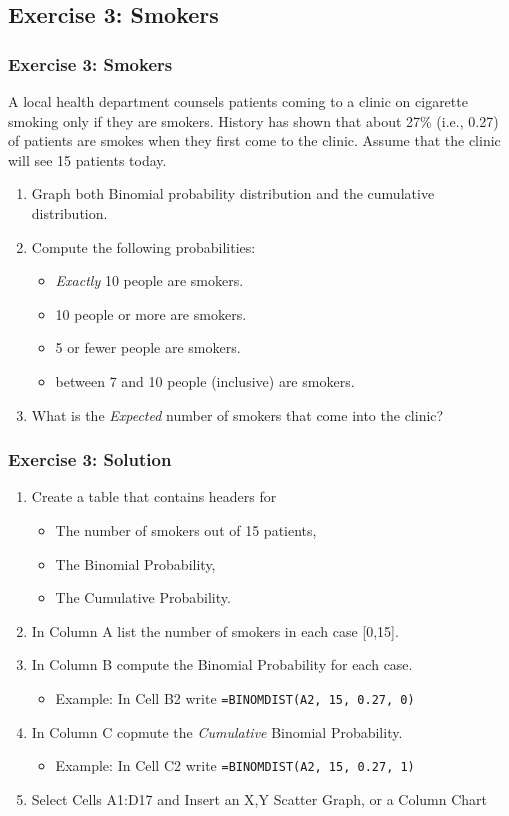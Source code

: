 \documentclass[12pt]{beamer}
\begin{document}
\subsection{Exercise 3: Smokers}
	\begin{frame}
		\frametitle{Exercise 3: Smokers}
		A local health department counsels patients coming to a clinic on cigarette smoking only if they are smokers. History has shown that about 27\% (i.e., 0.27) of patients are smokes when they first come to the clinic. Assume that the clinic will see 15 patients today.\\
		\bigskip
		\begin{enumerate}
			\item Graph both Binomial probability distribution and the cumulative distribution.
			\item Compute the following probabilities:
				\begin{itemize}
					\item \textit{Exactly} 10 people are smokers.
					\item 10 people or more are smokers.
					\item 5 or fewer people are smokers.
					\item between 7 and 10 people (inclusive) are smokers.
				\end{itemize}
			\item What is the \textit{Expected} number of smokers that come into the clinic?
		\end{enumerate} 
	\end{frame}
	\begin{frame}
	\frametitle{Exercise 3: Solution}
		\begin{enumerate}
			\item Create a table that contains headers for 
			\begin{itemize}
				 \item The number of smokers out of 15 patients, 
				 \item The Binomial Probability,
				 \item The Cumulative Probability.
			\end{itemize}
			\item In Column A list the number of smokers in each case [0,15].
			\item In Column B compute the Binomial Probability for each case. 
				\begin{itemize}
					\item Example: In Cell B2 write \texttt{=BINOMDIST(A2, 15, 0.27, 0)}
				\end{itemize}
			\item In Column C copmute the \textit{Cumulative} Binomial Probability.
				\begin{itemize}
					\item Example: In Cell C2 write \texttt{=BINOMDIST(A2, 15, 0.27, 1)}
				\end{itemize}
			\item Select Cells A1:D17 and Insert an X,Y Scatter Graph, or a Column Chart 
			\end{enumerate}
	\end{frame}
\end{document}

